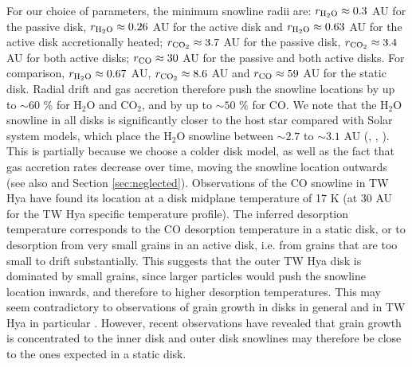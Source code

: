 \documentclass[apj]{emulateapj}
\newcommand{\emgr}[1]{\emph{ \color{gray} #1}}
\begin{document}

For our choice of parameters, the minimum snowline radii are: $r_{\rm{H_2O}} \approx 0.3$ AU for the passive disk, $r_{\rm{H_2O}} \approx 0.26$ AU for the active disk and $r_{\rm{H_2O}} \approx 0.63$ AU for the active disk accretionally heated; $r_{\rm{CO_2}} \approx 3.7$ AU for the passive disk, $r_{\rm{CO_2}} \approx 3.4$ AU for both active disks; $r_{\rm{CO}} \approx 30$ AU for the passive and both active disks. For comparison, $r_{\rm{H_2O}} \approx 0.67$ AU, $r_{\rm{CO_2}} \approx 8.6$ AU and $r_{\rm{CO}} \approx 59$ AU for the static disk. Radial drift and gas accretion therefore push the snowline locations by up to $\sim$$60$ \% for H$_2$O and CO$_2$, and by up to $\sim$$50$ \% for CO.  We note that the H$_2$O snowline in all disks is significantly closer to the host star compared with Solar system models, which place the H$_2$O snowline between $\sim$$2.7$ to $\sim$$3.1$ AU (\citealt{hayashi81}, \citealt{podolak04}, \citealt{martin12}). This is partially because we choose a colder disk model, as well as the fact that gas accretion rates decrease over time, moving the snowline location outwards (see also \citealt{garaud07} and Section \ref{sec:neglected}). Observations of the CO snowline in TW Hya \citep{qi13} have found its location at a disk midplane temperature of 17 K (at 30 AU for the TW Hya specific temperature profile). The inferred  desorption temperature corresponds to the CO desorption temperature in a static disk, or to desorption from very small grains in an active disk, i.e. from grains that are too small to drift substantially. This suggests that the outer TW Hya disk is dominated by small grains, since larger particles would push the snowline location inwards, and therefore to higher desorption temperatures. This may seem contradictory to observations of grain growth in disks in general and in TW Hya in particular \citep{wilner00}. However, recent observations have revealed that grain growth is concentrated to the inner disk \citep{perez12} and outer disk snowlines may therefore be close to the ones expected in a static disk.


\end{document}
